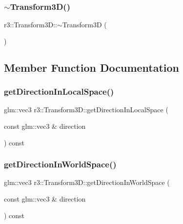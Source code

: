 \subsubsection{\texorpdfstring{$\sim$\+Transform3\+D()}{~Transform3D()}}
{\footnotesize\ttfamily r3\+::\+Transform3\+D\+::$\sim$\+Transform3D (\begin{DoxyParamCaption}{ }\end{DoxyParamCaption})\hspace{0.3cm}{\ttfamily [default]}}



\subsection{Member Function Documentation}
\mbox{\label{classr3_1_1_transform3_d_ac942055c92499597d01b309b4068917e}} 
\subsubsection{\texorpdfstring{get\+Direction\+In\+Local\+Space()}{getDirectionInLocalSpace()}}
{\footnotesize\ttfamily glm\+::vec3 r3\+::\+Transform3\+D\+::get\+Direction\+In\+Local\+Space (\begin{DoxyParamCaption}\item[{const glm\+::vec3 \&}]{direction }\end{DoxyParamCaption}) const}

\mbox{\label{classr3_1_1_transform3_d_a16c5747e86d579935b808a15f4804b2f}} 
\subsubsection{\texorpdfstring{get\+Direction\+In\+World\+Space()}{getDirectionInWorldSpace()}}
{\footnotesize\ttfamily glm\+::vec3 r3\+::\+Transform3\+D\+::get\+Direction\+In\+World\+Space (\begin{DoxyParamCaption}\item[{const glm\+::vec3 \&}]{direction }\end{DoxyParamCaption}) const}


